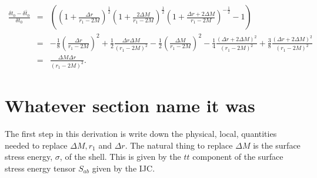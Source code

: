 \documentclass[aps,showpacs,onecolumn,floats,prd,superscriptaddress,nofootinbib]{revtex4-1}
\begin{document}
\begin{eqnarray}
	\frac{\delta t_0 - \bar{\delta t_0}}{\delta t_0} & = & 
	\left( \left( 1+ \frac{\Delta r}{r_1 - 2M} \right)^\frac{1}{2} \left( 1 + \frac{2\Delta M}{r_1 - 2M} \right)^\frac{1}{2} \left( 1 + \frac{\Delta r + 2 \Delta M}{r_1 - 2M} \right)^{-\frac{1}{2}} - 1 \right)	\nonumber	\\
	& = & - \frac{1}{8} \left( \frac{\Delta r}{r_1 - 2M} \right)^2 + 
	\frac{1}{2} \frac{\Delta r \Delta M}{(r_1 - 2M)^2} - 
	\frac{1}{2} \left( \frac{\Delta M}{r_1 - 2M} \right)^2 - 
	\frac{1}{4} \frac{( \Delta r + 2 \Delta M)^2}{(r_1 - 2M)^2} + 
	\frac{3}{8} \frac{(\Delta r+ 2 \Delta M)^2}{(r_1 - 2M)^2} 	\nonumber	\\
	& = & \frac{\Delta M \Delta r}{(r_1 - 2M)^2}.
\end{eqnarray}
	
%
%

\section{Whatever section name it was}
\label{finalEq}

The first step in this derivation is write down the physical, local, quantities needed to replace $\Delta M, r_1$ and $\Delta r$. The natural thing to replace $\Delta M$ is the surface stress energy, $\sigma$, of the shell. This is given by the $tt$ component of the surface stress energy tensor $S_{ab}$ given by the IJC.
\end{document}
